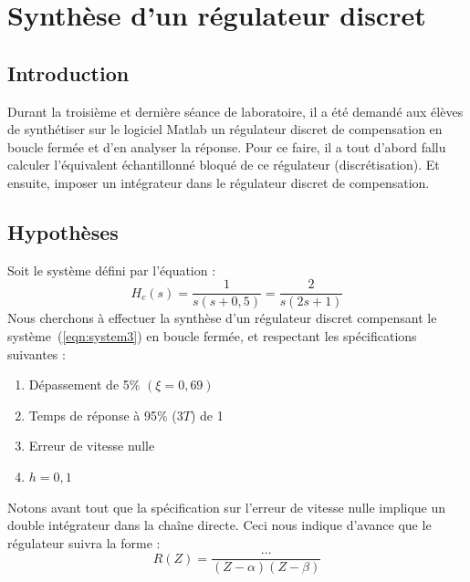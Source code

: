 \chapter{Synthèse d'un régulateur discret}

\section{Introduction}
Durant la troisième et dernière séance de laboratoire, il a été demandé aux élèves de synthétiser sur le logiciel Matlab\textregistered{} un régulateur discret de compensation en boucle fermée et d'en analyser la réponse.
Pour ce faire, il a tout d'abord fallu calculer l'équivalent échantillonné bloqué de ce régulateur (discrétisation).
Et ensuite, imposer un intégrateur dans le régulateur discret de compensation.

\section{Hypothèses}
Soit le système défini par l'équation :
\begin{equation}
	H_c(s) = \frac{1}{s\left( s+0,5\right)}
		   = \frac{2}{s\left(2s+1  \right)}
	\label{eqn:system3}
\end{equation}
Nous cherchons à effectuer la synthèse d'un régulateur discret compensant le système~(\ref{eqn:system3}) en boucle fermée, et respectant les spécifications suivantes :
\begin{enumerate}
	\item Dépassement de 5\% $(\xi=0,69)$
	\item Temps de réponse à 95\% ($3T$) de 1
	\item Erreur de vitesse nulle
	\item $h = 0,1$
\end{enumerate}
Notons avant tout que la spécification sur l'erreur de vitesse nulle implique un double intégrateur dans la chaîne directe.
Ceci nous indique d'avance que le régulateur suivra la forme :
\begin{equation}
	R(Z) = \frac{\dots}{(Z-\alpha)(Z-\beta)}
\end{equation}


